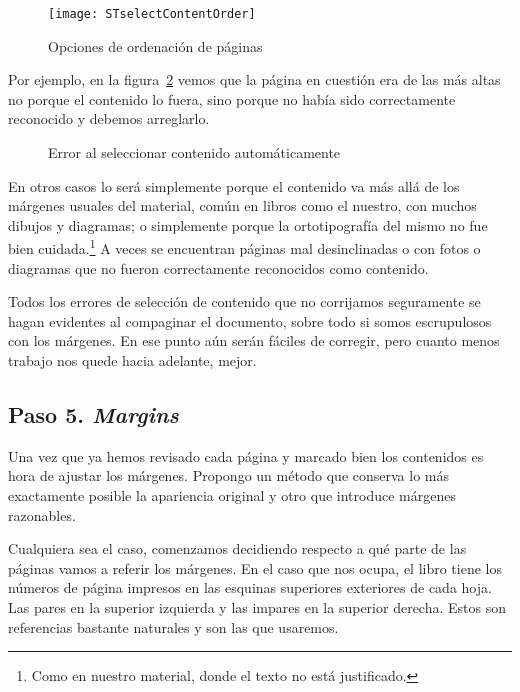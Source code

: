 \documentclass[%
	a5paper,
	10pt,
	twoside,
	openright,
	final,
]{memoir}
\begin{document}
{	\begin{figure}
		\centering
		\texttt{[image: STselectContentOrder]}
		\caption{Opciones de ordenación de páginas\label{fig:STselectContentOrder}}
	\end{figure}

	Por ejemplo, en la figura~\ref{fig:STselectContentError} vemos que la página en cuestión era de las más altas no porque el contenido lo fuera, sino porque no había sido correctamente reconocido y debemos arreglarlo.

	\begin{figure}
		\centering
		\caption{Error al seleccionar contenido automáticamente\label{fig:STselectContentError}}
	\end{figure}

	En otros casos lo será simplemente porque el contenido va más allá de los márgenes usuales del material, común en libros como el nuestro, con muchos dibujos y diagramas; o simplemente porque la ortotipografía del mismo no fue bien cuidada.\footnote{Como en nuestro material, donde el texto no está justificado.} A veces se encuentran páginas mal desinclinadas o con fotos o diagramas que no fueron correctamente reconocidos como contenido.

	Todos los errores de selección de contenido que no corrijamos seguramente se hagan evidentes al compaginar el documento, sobre todo si somos escrupulosos con los márgenes. En ese punto aún serán fáciles de corregir, pero cuanto menos trabajo nos quede hacia adelante, mejor.

	\subsection{Paso 5. \emph{Margins}\label{sec:STmargins}} Una vez que ya hemos revisado cada página y marcado bien los contenidos es hora de ajustar los márgenes. Propongo un método que conserva lo más exactamente posible la apariencia original y otro que introduce márgenes razonables.

	Cualquiera sea el caso, comenzamos decidiendo respecto a qué parte de las páginas vamos a referir los márgenes. En el caso que nos ocupa, el libro tiene los números de página impresos en las esquinas superiores exteriores de cada hoja. Las pares en la superior izquierda y las impares en la superior derecha. Estos son referencias bastante naturales y son las que usaremos.

}
\end{document}
